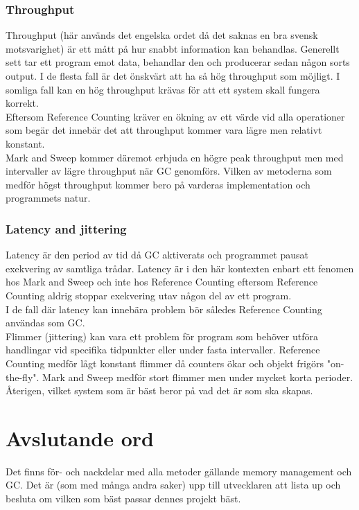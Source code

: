 \documentclass[12pt,a4paper]{article}
\begin{document}
\subsubsection{Throughput}
Throughput (här används det engelska ordet då det saknas en bra svensk motsvarighet) är ett mått på 
hur snabbt information kan behandlas. Generellt sett tar ett program emot data, behandlar den och producerar sedan någon sorts output. I de flesta fall är det önskvärt att ha så hög throughput som möjligt. I somliga fall kan en hög throughput krävas för att ett system skall fungera korrekt.\\
Eftersom Reference Counting kräver en ökning av ett värde vid alla operationer som begär det innebär det att throughput kommer vara lägre men relativt konstant.
\\
Mark and Sweep kommer däremot erbjuda en högre peak throughput men med intervaller av lägre 
throughput när GC genomförs. Vilken av metoderna som medför högst throughput kommer bero på varderas implementation och programmets natur.

\subsubsection{Latency and jittering}
Latency är den period av tid då GC aktiverats och programmet pausat exekvering av samtliga 
trådar\citep{latency}. Latency är i den här kontexten enbart ett fenomen hos Mark and Sweep och 
inte hos Reference Counting eftersom Reference Counting aldrig stoppar exekvering utav någon del av 
ett program.\\ 
I de fall där latency kan innebära problem bör således Reference Counting användas som GC.
\\
Flimmer (jittering) kan vara ett problem för program som behöver utföra handlingar vid specifika tidpunkter eller under fasta intervaller. Reference Counting medför lågt konstant flimmer då counters ökar och objekt frigörs "on-the-fly". Mark and Sweep medför stort flimmer men under mycket korta perioder. Återigen, vilket system som är bäst beror på vad det är som ska skapas.



\section{Avslutande ord}
Det finns för- och nackdelar med alla metoder gällande memory management och GC. Det är (som med många andra saker) upp till utvecklaren att lista up och besluta om vilken som bäst passar dennes projekt bäst.


\clearpage

\end{document}
